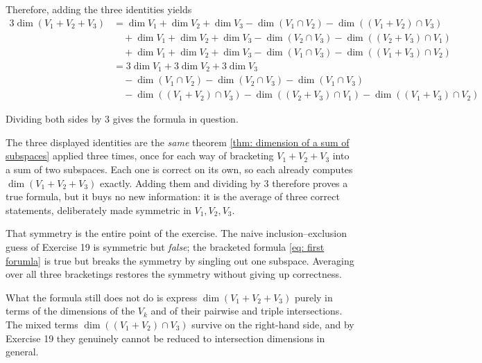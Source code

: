 \begin{xrcs}
  Therefore, adding the three identities yields
  \begin{equation}
    \begin{aligned}
      3 \dim (V_1 + V_2 + V_3) &=
      \dim V_1 + \dim V_2 + \dim V_3 - \dim(V_1 \cap V_2) - \dim ((V_1 + V_2) \cap V_3) \\
      & \quad + \dim V_1 + \dim V_2 + \dim V_3 - \dim(V_2 \cap V_3) - \dim ((V_2 + V_3) \cap V_1) \\
      & \quad + \dim V_1 + \dim V_2 + \dim V_3 - \dim(V_1 \cap V_3) - \dim ((V_1 + V_3) \cap V_2) \\
      & = 3 \dim V_1 + 3 \dim V_2 + 3 \dim V_3 \\
      & \quad - \dim(V_1 \cap V_2) - \dim(V_2 \cap V_3) - \dim(V_1 \cap V_3) \\
      & \quad - \dim ((V_1 + V_2) \cap V_3) - \dim ((V_2 + V_3) \cap V_1) - \dim ((V_1 + V_3) \cap V_2)
    \end{aligned}
  \end{equation}

  Dividing both sides by $3$ gives the formula in question.
\end{xrcs}

\begin{ainote}
  The three displayed identities are the \emph{same} theorem \ref{thm: dimension of a sum of subspaces} applied three times, once for each way of bracketing $V_1 + V_2 + V_3$ into a sum of two subspaces. Each one is correct on its own, so each already computes $\dim(V_1+V_2+V_3)$ exactly. Adding them and dividing by $3$ therefore proves a true formula, but it buys no new information: it is the average of three correct statements, deliberately made symmetric in $V_1, V_2, V_3$.

  That symmetry is the entire point of the exercise. The naive inclusion--exclusion guess of Exercise 19 is symmetric but \emph{false}; the bracketed formula \eqref{eq: first forumla} is true but breaks the symmetry by singling out one subspace. Averaging over all three bracketings restores the symmetry without giving up correctness.

  What the formula still does not do is express $\dim(V_1+V_2+V_3)$ purely in terms of the dimensions of the $V_k$ and of their pairwise and triple intersections. The mixed terms $\dim((V_1+V_2) \cap V_3)$ survive on the right-hand side, and by Exercise 19 they genuinely cannot be reduced to intersection dimensions in general.
\end{ainote}

